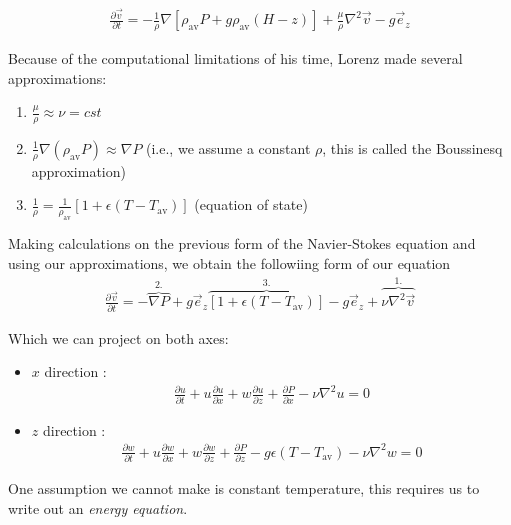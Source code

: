 \begin{align*}
    \frac{\partial \vec{v}}{ \partial t} = - \frac{1}{\rho} \nabla \left[ \rho_\text{av} P + g \rho_\text{av} (H-z) \right] + \frac{\mu}{\rho} \nabla^2 \vec{v} - g \vec{e}_z 
\end{align*}

Because of the computational limitations of his time, Lorenz made several approximations:

\begin{enumerate}
    \item $\frac{\mu}{\rho} \approx \nu = cst$ 
    \item $\frac{1}{\rho} \nabla (\rho_\text{av} P) \approx \nabla P$ (i.e., we assume a constant $\rho$, this is called the Boussinesq approximation)
    \item $\frac{1}{\rho} = \frac{1}{\rho_\text{av}} \left[ 1 + \epsilon (T-T_\text{av}) \right]$ (equation of state)
\end{enumerate}
Making calculations on the previous form of the Navier-Stokes equation and using our approximations, we obtain the followiing form of our equation
\begin{align*}
    \frac{\partial \vec{v}}{ \partial t} = - \overbrace{\nabla P}^{2.} + g \vec{e}_z \overbrace{ \left[1 + \epsilon (T-T_\text{av})\right]}^{3.} - g \vec{e}_z + \overbrace{\nu \nabla^2 \vec{v}}^{1.}
\end{align*}

Which we can project on both axes:
\begin{itemize}
    \item $x$ direction :
        \begin{align}
            \frac{\partial u }{\partial t} + u \frac{\partial u }{\partial x} + w \frac{\partial u }{\partial z} + \frac{\partial P }{\partial x} - \nu \nabla^2 u = 0 \tag{2}  
        \end{align}
    \item $z$ direction :
        \begin{align*}
            \frac{\partial w }{\partial t} + u \frac{\partial w }{\partial x} + w \frac{\partial w }{\partial z} + \frac{\partial P }{\partial z} - g \epsilon (T-T_\text{av}) - \nu \nabla^2 w = 0 \tag{3}
        \end{align*}
\end{itemize}

One assumption we cannot make is constant temperature, this requires us to write out an \textit{energy equation}.

